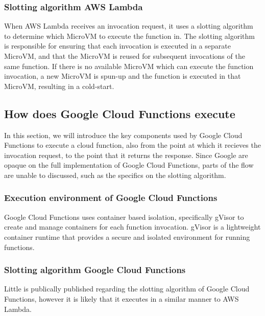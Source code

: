 %    

\subsubsection{Slotting algorithm AWS Lambda}
\label{sec:aws-lambda-slotting-algorithm}
When AWS Lambda receives an invocation request, it uses a slotting algorithm to determine which MicroVM to execute the function in. The slotting algorithm is responsible for ensuring that each invocation is executed in a separate MicroVM, and that the MicroVM is reused for subsequent invocations of the same function. If there is no available MicroVM which can execute the function invocation, a new MicroVM is spun-up and the function is executed in that MicroVM, resulting in a cold-start.

\subsection{How does Google Cloud Functions execute \faaslong{}}
\label{sec:google-cloud-functions-execution}
In this section, we will introduce the key components used by Google Cloud Functions to execute a cloud function, also from the point at which it recieves the invocation request, to the point that it returns the response. Since Google are opaque on the full implementation of Google Cloud Functions, parts of the flow are unable to discussed, such as the specifics on the slotting algorithm.

\subsubsection{Execution environment of Google Cloud Functions}
\label{sec:google-cloud-functions-execution-environment}
Google Cloud Functions uses container based isolation\cite{HowGVisorProtects}, specifically gVisor\cite{GVisor} to create and manage containers for each function invocation. gVisor is a lightweight container runtime that provides a secure and isolated environment for running functions.

\subsubsection{Slotting algorithm Google Cloud Functions}
Little is publically published regarding the slotting algorithm of Google Cloud Functions, however it is likely that it executes in a similar manner to AWS Lambda.

